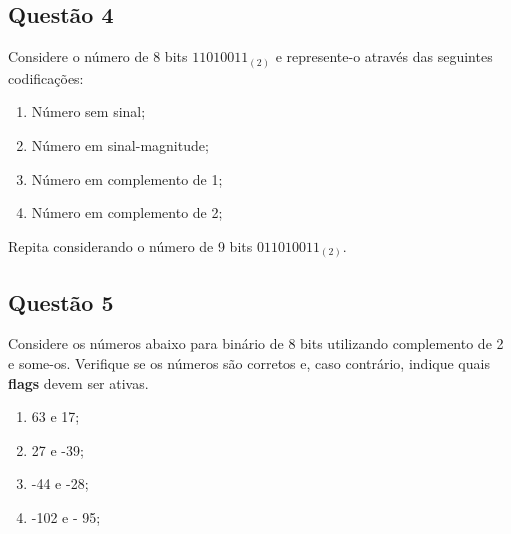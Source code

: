 \documentclass{article}
\begin{document}
        \subsection{Questão 4}
            \begin{exercise}
                Considere o número de 8 bits $11010011_{(2)}$ e represente-o através das seguintes codificações:
                    \begin{enumerate}[noitemsep]
                        \item Número sem sinal;
                        \item Número em sinal-magnitude;
                        \item Número em complemento de 1;
                        \item Número em complemento de 2;
                    \end{enumerate}
                Repita considerando o número de 9 bits $011010011_{(2)}$.
            \end{exercise}
            \begin{resolution}

            \end{resolution}
\newpage

        \subsection{Questão 5}
            \begin{exercise}
                Considere os números abaixo para binário de 8 bits utilizando complemento de 2 e some-os. Verifique se os números são corretos e, caso contrário, indique quais \textbf{flags} devem ser ativas.
                \begin{enumerate}[noitemsep]
                    \item 63 e 17;
                    \item 27 e -39;
                    \item -44 e -28;
                    \item -102 e - 95;
                \end{enumerate}
            \end{exercise}
            \begin{resolution}

            \end{resolution}
\newpage
\end{document}
